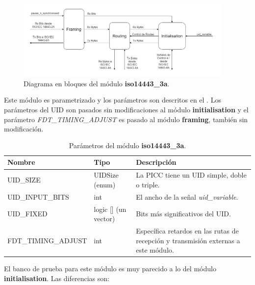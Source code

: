 \documentclass[a4paper, twoside, 11pt]{report}
\begin{document}
\begin{figure}[htb]
  \centering
  \includegraphics[width=0.95\textwidth]{./img/iso14443_3a.drawio}
  \caption{Diagrama en bloques del módulo \textbf{iso14443\_3a}.}
  \label{fig:iso14443_3a}
\end{figure}

Este módulo es parametrizado y los parámetros son descritos en el . Los parámetros del UID son pasados sin modificaciones al módulo \textbf{initialisation} y el parámetro \textit{FDT\_TIMING\_ADJUST} es pasado al módulo \textbf{framing}, también sin modificación.

\begin{table}[htb]
  \centering
  \tablezebra
  \begin{tabulary}{\linewidth}{l|l|L}
    \textbf{Nombre}&\textbf{Tipo}&\textbf{Descripción} \\
    \hline
    UID\_SIZE&UIDSize (enum)&La PICC tiene un UID simple, doble o triple. \\
    UID\_INPUT\_BITS&int&El ancho de la señal \textit{uid\_variable}. \\
    UID\_FIXED&logic [] (un vector)&Bits más significativos del UID. \\
    FDT\_TIMING\_ADJUST&int&Específica retardos en las rutas de recepción y transmisión externas a este módulo. \\
  \end{tabulary}
  \caption{Parámetros del módulo \textbf{iso14443\_3a}.}
  \label{tab:params_iso14443_3a}
\end{table}

\FloatBarrier

El banco de prueba para este módulo es muy parecido a lo del módulo \textbf{initialisation}. Las diferencias son:
\end{document}
